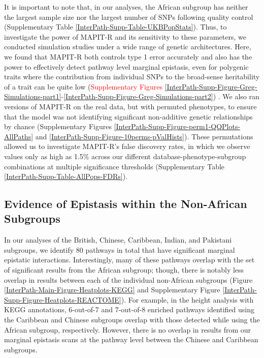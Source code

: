 \documentclass[10pt]{article}
\begin{document}
It is important to note that, in our analyses, the African subgroup has neither the largest sample size nor the largest number of SNPs following quality control (Supplementary Table \ref{InterPath-Supp-Table-UKBPopStats}). Thus, to investigate the power of MAPIT-R and its sensitivity to these parameters, we conducted simulation studies under a wide range of genetic architectures. Here, we found that MAPIT-R both controls type 1 error accurately and also has the power to effectively detect pathway level marginal epistasis, even for polygenic traits where the contribution from individual SNPs to the broad-sense heritability of a trait can be quite low (\textcolor{red}{Supplementary Figures \ref{InterPath-Supp-Figure-Greg-Simulations-part1}-\ref{InterPath-Supp-Figure-Greg-Simulations-part2}}) \cite{Crawford2017a}. We also ran versions of MAPIT-R on the real data, but with permuted phenotypes, to ensure that the model was not identifying significant non-additive genetic relationships by chance (Supplementary Figures \ref{InterPath-Supp-Figure-perm1-QQPlots-AllPaths} and \ref{InterPath-Supp-Figure-10perms-pValHists}). These permutations allowed us to investigate MAPIT-R's false discovery rates, in which we observe values only as high as 1.5\% across our different database-phenotype-subgroup combinations at multiple significance thresholds (Supplementary Table \ref{InterPath-Supp-Table-AllPops-FDRs}).

\subsection*{Evidence of Epistasis within the Non-African Subgroups}

In our analyses of the British, Chinese, Caribbean, Indian, and Pakistani subgroups, we identify 80 pathways in total that have significant marginal epistatic interactions. Interestingly, many of these pathways overlap with the set of significant results from the African subgroup; though, there is notably less overlap in results between each of the individual non-African subgroups (Figure \ref{InterPath-Main-Figure-Heatplots-KEGG} and Supplementary Figure \ref{InterPath-Supp-Figure-Heatplots-REACTOME}). For example, in the height analysis with KEGG annotations, 6-out-of-7 and 7-out-of-8 enriched pathways identified using the Caribbean and Chinese subgroups overlap with those detected while using the African subgroup, respectively. However, there is no overlap in results from our marginal epistasis scans at the pathway level between the Chinese and Caribbean subgroups.
\end{document}

